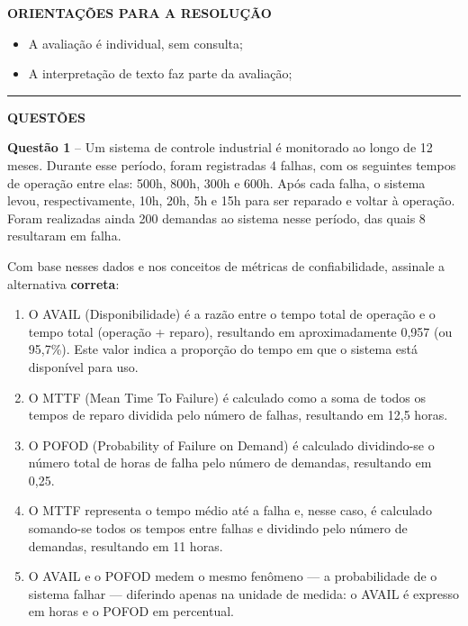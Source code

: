 \documentclass[12pt,a4paper]{article}
\begin{document}
\textbf{ORIENTAÇÕES PARA A RESOLUÇÃO}  

\begin{itemize}
    \item A avaliação é individual, sem consulta;
    \item A interpretação de texto faz parte da avaliação;
\end{itemize}

\vspace{0.5cm}

\begin{center}
    \rule{\textwidth}{0.4pt}
    \textbf{QUESTÕES}
\end{center}

\vspace{0.5cm}

\textbf{Questão 1} -- Um sistema de controle industrial é monitorado ao longo de 12 meses. Durante esse período, foram registradas 4 falhas, com os seguintes tempos de operação entre elas: 500h, 800h, 300h e 600h. Após cada falha, o sistema levou, respectivamente, 10h, 20h, 5h e 15h para ser reparado e voltar à operação. Foram realizadas ainda 200 demandas ao sistema nesse período, das quais 8 resultaram em falha.

Com base nesses dados e nos conceitos de métricas de confiabilidade, assinale a alternativa \textbf{correta}:

\vspace{0.3cm}

\begin{enumerate}[label=\textbf{(\Alph*)}]
  
  \item O AVAIL (Disponibilidade) é a razão entre o tempo total de operação e o tempo total (operação + reparo), resultando em aproximadamente 0,957 (ou 95,7\%). Este valor indica a proporção do tempo em que o sistema está disponível para uso.
  \item O MTTF (Mean Time To Failure) é calculado como a soma de todos os tempos de reparo dividida pelo número de falhas, resultando em 12,5 horas.

    \item O POFOD (Probability of Failure on Demand) é calculado dividindo-se o número total de horas de falha pelo número de demandas, resultando em 0,25.

    \item O MTTF representa o tempo médio até a falha e, nesse caso, é calculado somando-se todos os tempos entre falhas e dividindo pelo número de demandas, resultando em 11 horas.

    \item O AVAIL e o POFOD medem o mesmo fenômeno — a probabilidade de o sistema falhar — diferindo apenas na unidade de medida: o AVAIL é expresso em horas e o POFOD em percentual.
\end{enumerate}
\end{document}
